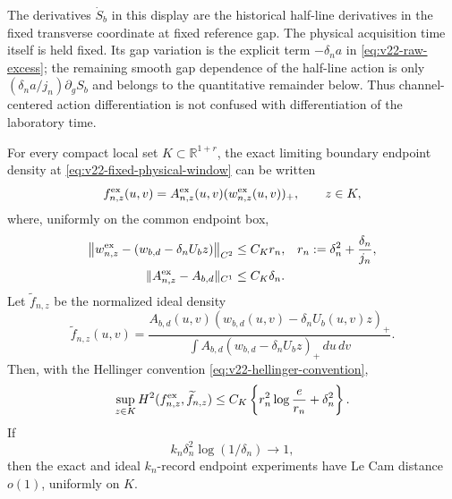 The derivatives $\dot S_b$ in this display are the historical half-line
derivatives in the fixed transverse coordinate at fixed reference gap.  The
physical acquisition time itself is held fixed.  Its gap variation is the
explicit term $-\delta_na$ in \eqref{eq:v22-raw-excess}; the remaining smooth
gap dependence of the half-line action is only
$(\delta_na/j_n)\partial_gS_b$ and belongs to the quantitative remainder
below.  Thus channel-centered action differentiation is not confused with
differentiation of the laboratory time.

\begin{proposition}
\label{prop:v22-fixed-window-reduction}
For every compact local set $K\subset\mathbb R^{1+r}$, the exact limiting
boundary endpoint density at \eqref{eq:v22-fixed-physical-window} can be
written
\begin{equation}\label{eq:v22-exact-endpoint-density}
 f^{\rm ex}_{n,z}(u,v)
 =A^{\rm ex}_{n,z}(u,v)(w^{\rm ex}_{n,z}(u,v))_+,
 \qquad z\in K,
\end{equation}
where, uniformly on the common endpoint box,
\begin{align}
 \bigl\|w^{\rm ex}_{n,z}
 -(w_{b,d}-\delta_nU_bz)\bigr\|_{C^2}
 &\le C_Kr_n,
 &r_n&:=\delta_n^2+\frac{\delta_n}{j_n},
                                      \label{eq:v22-support-remainder}\\
 \|A^{\rm ex}_{n,z}-A_{b,d}\|_{C^1}
 &\le C_K\delta_n.                  \label{eq:v22-amplitude-remainder}
\end{align}
Let $\widetilde f_{n,z}$ be the normalized ideal density
\begin{equation}\label{eq:v22-ideal-endpoint-density}
 \widetilde f_{n,z}(u,v)=
 \frac{A_{b,d}(u,v)(w_{b,d}(u,v)-\delta_nU_b(u,v)z)_+}
 {\displaystyle\int A_{b,d}
  (w_{b,d}-\delta_nU_bz)_+\,du\,dv}.
\end{equation}
Then, with the Hellinger convention
\eqref{eq:v22-hellinger-convention},
\begin{equation}\label{eq:v22-exact-ideal-hellinger}
 \sup_{z\in K}H^2(f^{\rm ex}_{n,z},\widetilde f_{n,z})
 \le C_K\left\{r_n^2\log\frac e{r_n}+\delta_n^2\right\}.
\end{equation}
If
\begin{equation}\label{eq:v22-critical-success-scale}
 k_n\delta_n^2\log(1/\delta_n)\longrightarrow1,
\end{equation}
then the exact and ideal $k_n$-record endpoint experiments have Le Cam
distance $o(1)$, uniformly on $K$.
\end{proposition}

